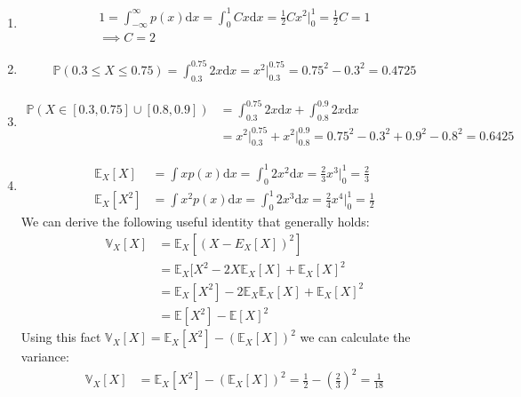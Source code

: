 \begin{enumerate}[label=\alph*.]
\item
\begin{align*}
1 = \int_{-\infty}^{\infty} p(x) \mathrm d x = \int_0^1 Cx \mathrm d x = \frac{1}{2} C x^2 \Big|_{0}^1 = \frac{1}{2}C = 1 \\
\implies C = 2
\end{align*}
\item
\begin{align*}
\mathbb{P}(0.3 \leq X \leq 0.75) = \int_{0.3}^{0.75} 2x \mathrm d x = x^2 \Big|_{0.3}^{0.75} = 0.75^2 - 0.3^2 = 0.4725
\end{align*}
\item
\begin{align*}
\mathbb{P}(X \in [0.3, 0.75] \cup [0.8, 0.9])
&= \int_{0.3}^{0.75} 2x \mathrm d x + \int_{0.8}^{0.9} 2x \mathrm d x \\
&= x^2 \Big|_{0.3}^{0.75} + x^2 \Big|_{0.8}^{0.9} = 0.75^2 - 0.3^2 + 0.9^2 - 0.8^2 = 0.6425
\end{align*}
\item
\begin{align*}
\mathbb{E}_X[X] &= \int x p(x) \mathrm d x = \int_0^1 2 x^2 \mathrm d x = \frac{2}{3} x^3 \Big|_0^1 = \frac{2}{3} \\
\mathbb{E}_X[X^2] &= \int x^2 p(x) \mathrm d x = \int_0^1 2 x^3 \mathrm d x = \frac{2}{4} x^4 \Big|_0^1 = \frac{1}{2}
\end{align*}
We can derive the following useful identity that generally holds:
\begin{align*}
\mathbb{V}_X[X] &= \mathbb{E}_X[(X - E_X[X])^2] \\
&= \mathbb{E}_X[X^2 - 2X \mathbb{E}_X[X] + \mathbb{E}_X[X]^2 \\
&= \mathbb{E}_X[X^2] - 2 \mathbb{E}_X \mathbb{E}_X[X] + \mathbb{E}_X[X]^2 \\
&= \mathbb{E}[X^2] - \mathbb{E}[X]^2
\end{align*}
Using this fact $\mathbb{V}_X[X] = \mathbb{E}_X[X^2] - (\mathbb{E}_X[X])^2$ we can calculate the variance:
\begin{align*}
\mathbb{V}_X[X] &= \mathbb{E}_X[X^2] - (\mathbb{E}_X[X])^2 = \frac{1}{2} - (\frac{2}{3})^2 = \frac{1}{18} \\
\end{align*}

\end{enumerate}

\paragraph{}

